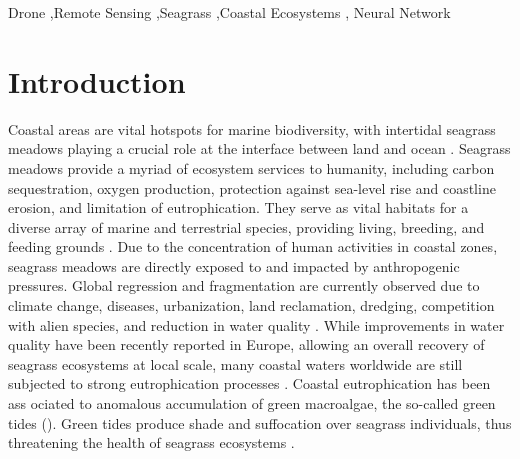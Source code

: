\documentclass[
  number]{elsarticle}
\begin{document}
\begin{frontmatter}
\begin{keyword}
    Drone \sep Remote Sensing \sep Seagrass \sep Coastal
Ecosystems \sep 
    Neural Network
\end{keyword}
\end{frontmatter}
    
\section{Introduction}\label{introduction}

Coastal areas are vital hotspots for marine biodiversity, with
intertidal seagrass meadows playing a crucial role at the interface
between land and ocean \citep{unsworth2022}. Seagrass meadows provide a
myriad of ecosystem services to humanity, including carbon
sequestration, oxygen production, protection against sea-level rise and
coastline erosion, and limitation of eutrophication. They serve as vital
habitats for a diverse array of marine and terrestrial species,
providing living, breeding, and feeding grounds \citetext{\citealp[
]{gardner2018}; \citealp[ ]{Zoffoli2022}; \citealp{jankowska2019}}. Due
to the concentration of human activities in coastal zones, seagrass
meadows are directly exposed to and impacted by anthropogenic pressures.
Global regression and fragmentation are currently observed due to
climate change, diseases, urbanization, land reclamation, dredging,
competition with alien species, and reduction in water quality
\citetext{\citealp[ ]{nguyen2021}; \citealp[ ]{soissons2018}; \citealp[
]{orth2006}; \citealp[ ]{lin2018}; \citealp{duffy2019}}. While
improvements in water quality have been recently reported in Europe,
allowing an overall recovery of seagrass ecosystems at local scale, many
coastal waters worldwide are still subjected to strong eutrophication
processes \citetext{\citealp[ ]{deSantos2019}; \citealp{Zoffoli2021}}.
Coastal eutrophication has been ass ociated to anomalous accumulation of
green macroalgae, the so-called green tides
(\citep{devlin2023nutrients}). Green tides produce shade and suffocation
over seagrass individuals, thus threatening the health of seagrass
ecosystems \citep{wang2022}.
\end{document}
